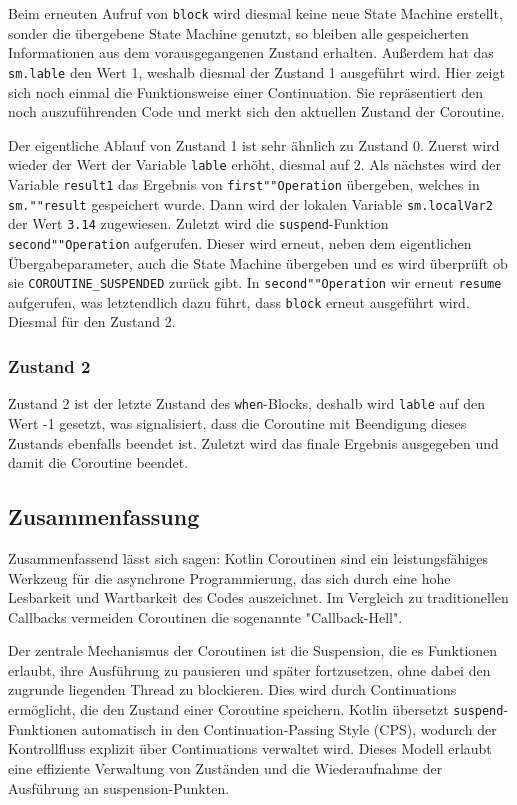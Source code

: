 \documentclass[fontsize=12pt,paper=a4,twoside=semi,parskip=half-,headsepline,headinclude]{scrreprt}
\begin{document}
Beim erneuten Aufruf von \texttt{block} wird diesmal keine neue State Machine erstellt, sonder die übergebene State Machine genutzt, so bleiben alle gespeicherten Informationen aus dem vorausgegangenen Zustand erhalten. Außerdem hat das \texttt{sm.lable} den Wert 1, weshalb diesmal der Zustand 1 ausgeführt wird. Hier zeigt sich noch einmal die Funktionsweise einer Continuation. Sie repräsentiert den noch auszuführenden Code und merkt sich den aktuellen Zustand der Coroutine. 

Der eigentliche Ablauf von Zustand 1 ist sehr ähnlich zu Zustand 0. Zuerst wird wieder der Wert der Variable \texttt{lable} erhöht, diesmal auf 2. Als nächstes wird der Variable \texttt{result1} das Ergebnis von \texttt{first""Operation} übergeben, welches in \texttt{sm.""result} gespeichert wurde. Dann wird der lokalen Variable \texttt{sm.localVar2} der Wert \texttt{3.14} zugewiesen. Zuletzt wird die \texttt{suspend}-Funktion \texttt{second""Operation} aufgerufen. Dieser wird erneut, neben dem eigentlichen Übergabeparameter, auch die State Machine übergeben und es wird überprüft ob sie \texttt{COROUTINE\_SUSPENDED} zurück gibt. In \texttt{second""Operation} wir erneut \texttt{resume} aufgerufen, was letztendlich dazu führt, dass \texttt{block} erneut ausgeführt wird. Diesmal für den Zustand 2.

\subsubsection{Zustand 2}

Zustand 2 ist der letzte Zustand des \texttt{when}-Blocks, deshalb wird \texttt{lable} auf den Wert -1 gesetzt, was signalisiert, dass die Coroutine mit Beendigung dieses Zustands ebenfalls beendet ist. Zuletzt wird das finale Ergebnis ausgegeben und damit die Coroutine beendet.

\subsection{Zusammenfassung}

Zusammenfassend lässt sich sagen: Kotlin Coroutinen sind ein leistungsfähiges Werkzeug für die asynchrone Programmierung, das sich durch eine hohe Lesbarkeit und Wartbarkeit des Codes auszeichnet. Im Vergleich zu traditionellen Callbacks vermeiden Coroutinen die sogenannte "Callback-Hell".

Der zentrale Mechanismus der Coroutinen ist die Suspension, die es Funktionen erlaubt, ihre Ausführung zu pausieren und später fortzusetzen, ohne dabei den zugrunde liegenden Thread zu blockieren. Dies wird durch Continuations ermöglicht, die den Zustand einer Coroutine speichern. Kotlin übersetzt \texttt{suspend}-Funktionen automatisch in den Continuation-Passing Style (CPS), wodurch der Kontrollfluss explizit über Continuations verwaltet wird. Dieses Modell erlaubt eine effiziente Verwaltung von Zuständen und die Wiederaufnahme der Ausführung an suspension-Punkten.
\end{document}
